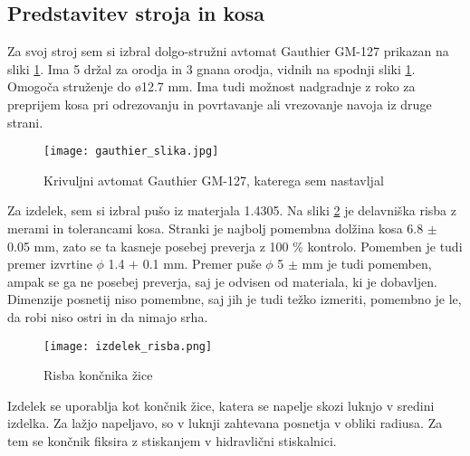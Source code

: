 \subsection{Predstavitev stroja in kosa}
Za svoj stroj sem si izbral dolgo-stružni avtomat Gauthier GM-127
prikazan na sliki \ref{gauthier_priblizano}.
Ima 5 držal za orodja in 3 gnana orodja, vidnih na spodnji
sliki \ref{gauthier_priblizano}. Omogoča struženje do ø12.7 mm.
Ima tudi možnost nadgradnje z roko za preprijem kosa pri odrezovanju in
povrtavanje ali vrezovanje navoja iz druge strani.

\begin{figure}[H]
	\begin{center}
		\texttt{[image: gauthier\_slika.jpg]}
		\caption{Krivuljni avtomat Gauthier GM-127, katerega sem nastavljal
			\cite{interna}}
		\label{gauthier_priblizano}
	\end{center}
\end{figure}

Za izdelek, sem si izbral pušo iz materjala 1.4305.
Na sliki \ref{delavniska_risba} je delavniška risba z
merami in tolerancami kosa. Stranki je najbolj pomembna dolžina
kosa 6.8 \(\pm\) 0.05 mm, zato se ta kasneje posebej preverja z
100 \% kontrolo. Pomemben je tudi premer izvrtine \(\phi\) 1.4 \(+\) 0.1 mm.
Premer puše \(\phi\) 5 \(\pm\) mm je tudi pomemben, ampak se ga
ne posebej preverja, saj je odvisen od materiala, ki je dobavljen.
Dimenzije posnetij niso pomembne, saj jih je tudi težko izmeriti,
pomembno je le, da robi niso ostri in da nimajo srha.

\begin{figure}[H]
	\begin{center}
		\texttt{[image: izdelek\_risba.png]}
		\caption{Risba končnika žice
			\cite{interna}}
		\label{delavniska_risba}
	\end{center}
\end{figure}

Izdelek se uporablja kot končnik žice, katera se napelje skozi
luknjo v sredini izdelka. Za lažjo napeljavo, so v luknji zahtevana
posnetja v obliki radiusa. Za tem se končnik fiksira z
stiskanjem v hidravlični stiskalnici.